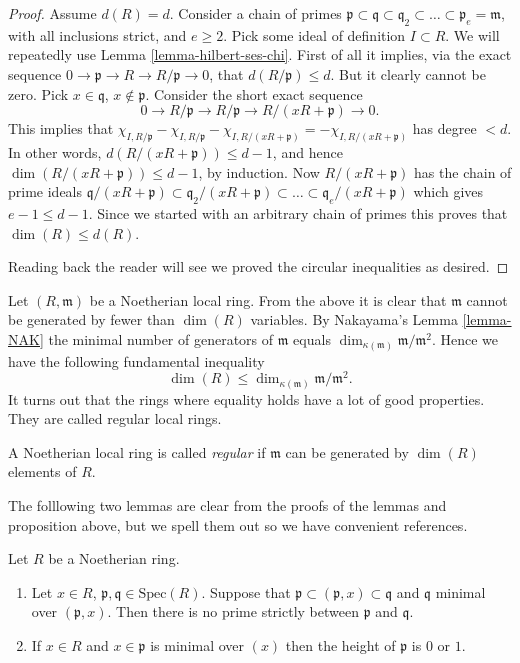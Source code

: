 \begin{proof}
\medskip\noindent
Assume $d(R) = d$. Consider a chain of primes
$\mathfrak p \subset \mathfrak q \subset
\mathfrak q_2 \subset \ldots \subset \mathfrak p_e = \mathfrak m$,
with all inclusions strict, and $e \geq 2$.
Pick some ideal of definition $I \subset R$.
We will repeatedly use
Lemma \ref{lemma-hilbert-ses-chi}. First of all
it implies, via the exact sequence
$0 \to \mathfrak p \to R \to R/\mathfrak p \to 0$,
that $d(R/\mathfrak p) \leq d$. But it clearly cannot
be zero. Pick $x\in \mathfrak q$, $x\not \in \mathfrak p$.
Consider the short exact sequence
$$
0 \to R/\mathfrak p \to R/\mathfrak p \to R/(xR + \mathfrak p) \to 0.
$$
This implies that $\chi_{I, R/\mathfrak p} - \chi_{I, R/\mathfrak p}
- \chi_{I, R/(xR + \mathfrak p)} = - \chi_{I, R/(xR + \mathfrak p)}$
has degree $ < d$. In other words, $d(R/(xR + \mathfrak p)) \leq d - 1$,
and hence $\dim(R/(xR + \mathfrak p)) \leq d - 1$, by
induction. Now $R/(xR + \mathfrak p)$ has the chain of prime ideals
$\mathfrak q/(xR + \mathfrak p) \subset \mathfrak q_2/(xR + \mathfrak p)
\subset \ldots \subset \mathfrak q_e/(xR + \mathfrak p)$ which gives
$e - 1 \leq d - 1$. Since we started with an arbitrary chain of
primes this proves that $\dim(R) \leq d(R)$.

\medskip\noindent
Reading back the reader will see we proved the circular
inequalities as desired.
\end{proof}

\noindent
Let $(R, \mathfrak m)$ be a Noetherian local ring.
From the above it is clear that $\mathfrak m$ cannot be
generated by fewer than $\dim(R)$ variables.
By Nakayama's Lemma \ref{lemma-NAK} the minimal number
of generators of $\mathfrak m$ equals $\dim_{\kappa(\mathfrak m)}
\mathfrak m/\mathfrak m^2$. Hence we have the following
fundamental inequality
$$
\dim(R) \leq \dim_{\kappa(\mathfrak m)} \mathfrak m/\mathfrak m^2.
$$
It turns out that the rings where equality holds
have a lot of good properties. They are called
regular local rings.

\begin{definition}
\label{definition-regular-local}
A Noetherian local ring is called {\it regular}
if $\mathfrak m$ can be generated by $\dim(R)$
elements of $R$.
\end{definition}


\noindent
The folllowing two lemmas are clear from the proofs of the
lemmas and proposition above, but we spell them out so we have
convenient references.

\begin{lemma}
\label{lemma-minimal-over-1}
Let $R$ be a Noetherian ring.
\begin{enumerate}
\item Let $x\in R$, $\mathfrak p, \mathfrak q\in \text{Spec}(R)$.
Suppose that $\mathfrak p \subset (\mathfrak p, x) \subset
\mathfrak q$ and $\mathfrak q$ minimal over $(\mathfrak p, x)$.
Then there is no prime strictly between $\mathfrak p$ and $\mathfrak q$.
\item If $x\in R$ and $x \in \mathfrak p$ is minimal over $(x)$
then the height of $\mathfrak p$ is $0$ or $1$.
\end{enumerate}
\end{lemma}

